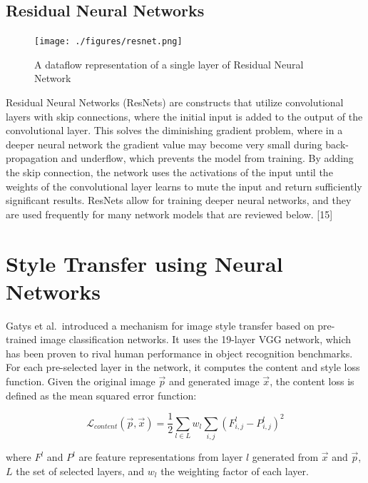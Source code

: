 \documentclass[12pt,a4paper,]{report}
\begin{document}
\hypertarget{residual-neural-networks}{%
\subsection{Residual Neural Networks}\label{residual-neural-networks}}

\begin{figure}[h]
    \texttt{[image: ./figures/resnet.png]}
    \centering
    \caption{A dataflow representation of a single layer of Residual Neural Network}
\end{figure}

Residual Neural Networks (ResNets) are constructs that utilize
convolutional layers with skip connections, where the initial input is
added to the output of the convolutional layer. This solves the
diminishing gradient problem, where in a deeper neural network the
gradient value may become very small during back-propagation and
underflow, which prevents the model from training. By adding the skip
connection, the network uses the activations of the input until the
weights of the convolutional layer learns to mute the input and return
sufficiently significant results. ResNets allow for training deeper
neural networks, and they are used frequently for many network models
that are reviewed below. {[}15{]}

\hypertarget{style-transfer-using-neural-networks}{%
\section{Style Transfer using Neural
Networks}\label{style-transfer-using-neural-networks}}

Gatys et al.~introduced a mechanism for image style transfer based on
pre-trained image classification networks. It uses the 19-layer VGG
network, which has been proven to rival human performance in object
recognition benchmarks. For each pre-selected layer in the network, it
computes the content and style loss function. Given the original image
\(\vec{p}\) and generated image \(\vec{x}\), the content loss is defined
as the mean squared error function:

\begin{equation}
    \mathcal{L}_{content}(\vec{p}, \vec{x}) = \frac{1}{2} \sum_{l \in L} w_l \sum_{i,j} (F^l_{i, j} - P^l_{i, j})^2
\end{equation}

where \(F^l\) and \(P^l\) are feature representations from layer \(l\)
generated from \(\vec{x}\) and \(\vec{p}\), \(L\) the set of selected
layers, and \(w_l\) the weighting factor of each layer.
\end{document}
